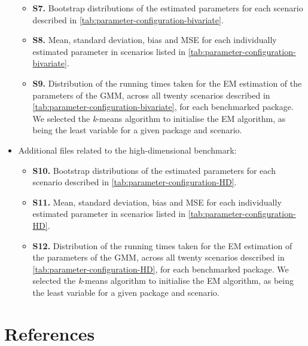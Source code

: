 \begin{itemize}
  \begin{itemize}
  \item
    \textbf{S7.} Bootstrap distributions of the estimated parameters for each
    scenario described in \ref{tab:parameter-configuration-bivariate}.
  \item
    \textbf{S8.} Mean, standard deviation, bias and MSE for each individually
    estimated parameter in scenarios listed in \ref{tab:parameter-configuration-bivariate}.
  \item
    \textbf{S9.} Distribution of the running times taken for the EM estimation of the parameters of the GMM, across all twenty scenarios described in \ref{tab:parameter-configuration-bivariate}, for each benchmarked package. We selected the \emph{k}-means algorithm to initialise the EM algorithm, as being the least variable for a given package and scenario.
  \end{itemize}
\item
  Additional files related to the high-dimensional benchmark:

  \begin{itemize}
  \item
    \textbf{S10.} Bootstrap distributions of the estimated parameters for each
    scenario described in \ref{tab:parameter-configuration-HD}.
  \item
    \textbf{S11.} Mean, standard deviation, bias and MSE for each individually
    estimated parameter in scenarios listed in \ref{tab:parameter-configuration-HD}.
  \item
    \textbf{S12.} Distribution of the running times taken for the EM estimation of the parameters of the GMM, across all twenty scenarios described in \ref{tab:parameter-configuration-HD}, for each benchmarked package. We selected the \emph{k}-means algorithm to initialise the EM algorithm, as being the least variable for a given package and scenario.
  \end{itemize}
\end{itemize}

\hypertarget{references}{%
\section{References}\label{references}}



\address{%
Bastien Chassagnol\\
Laboratoire de Probabilités, Statistiques et Modélisation (LPSM), UMR CNRS 8001\\%
4 Place Jussieu Sorbonne Université\\ 75005, Paris, France\\
%
%
\textit{ORCiD: \href{https://orcid.org/0000-0002-8955-2391}{0000-0002-8955-2391}}\\%
\href{mailto:bastien_chassagnol@laposte.net}{\nolinkurl{bastien\_chassagnol@laposte.net}}%
}

